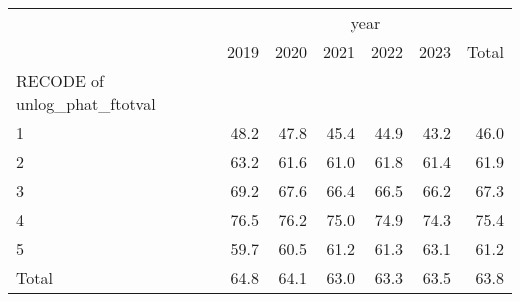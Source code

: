 \begin{tabular}{lllllll}
\cline{1-7}
\multicolumn{1}{c}{} &
  \multicolumn{6}{|c}{year} \\
\multicolumn{1}{c}{} &
  \multicolumn{1}{|r}{2019} &
  \multicolumn{1}{r}{2020} &
  \multicolumn{1}{r}{2021} &
  \multicolumn{1}{r}{2022} &
  \multicolumn{1}{r}{2023} &
  \multicolumn{1}{r}{Total} \\
\cline{1-7}
\multicolumn{1}{l}{RECODE of unlog\_phat\_ftotval} &
  \multicolumn{1}{|r}{} &
  \multicolumn{1}{r}{} &
  \multicolumn{1}{r}{} &
  \multicolumn{1}{r}{} &
  \multicolumn{1}{r}{} &
  \multicolumn{1}{r}{} \\
\multicolumn{1}{l}{\hspace{1em}1} &
  \multicolumn{1}{|r}{48.2} &
  \multicolumn{1}{r}{47.8} &
  \multicolumn{1}{r}{45.4} &
  \multicolumn{1}{r}{44.9} &
  \multicolumn{1}{r}{43.2} &
  \multicolumn{1}{r}{46.0} \\
\multicolumn{1}{l}{\hspace{1em}2} &
  \multicolumn{1}{|r}{63.2} &
  \multicolumn{1}{r}{61.6} &
  \multicolumn{1}{r}{61.0} &
  \multicolumn{1}{r}{61.8} &
  \multicolumn{1}{r}{61.4} &
  \multicolumn{1}{r}{61.9} \\
\multicolumn{1}{l}{\hspace{1em}3} &
  \multicolumn{1}{|r}{69.2} &
  \multicolumn{1}{r}{67.6} &
  \multicolumn{1}{r}{66.4} &
  \multicolumn{1}{r}{66.5} &
  \multicolumn{1}{r}{66.2} &
  \multicolumn{1}{r}{67.3} \\
\multicolumn{1}{l}{\hspace{1em}4} &
  \multicolumn{1}{|r}{76.5} &
  \multicolumn{1}{r}{76.2} &
  \multicolumn{1}{r}{75.0} &
  \multicolumn{1}{r}{74.9} &
  \multicolumn{1}{r}{74.3} &
  \multicolumn{1}{r}{75.4} \\
\multicolumn{1}{l}{\hspace{1em}5} &
  \multicolumn{1}{|r}{59.7} &
  \multicolumn{1}{r}{60.5} &
  \multicolumn{1}{r}{61.2} &
  \multicolumn{1}{r}{61.3} &
  \multicolumn{1}{r}{63.1} &
  \multicolumn{1}{r}{61.2} \\
\multicolumn{1}{l}{\hspace{1em}Total} &
  \multicolumn{1}{|r}{64.8} &
  \multicolumn{1}{r}{64.1} &
  \multicolumn{1}{r}{63.0} &
  \multicolumn{1}{r}{63.3} &
  \multicolumn{1}{r}{63.5} &
  \multicolumn{1}{r}{63.8} \\
\cline{1-7}
\end{tabular}
